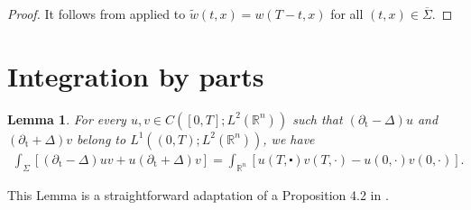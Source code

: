 \documentclass[10pt,a4paper]{amsart}
\newtheorem{lemma}[proposition]{Lemma}
\theoremstyle{remark}
\theoremstyle{definition}
\newcommand{\tm}{\mathrm{t}}
\begin{document}
\begin{proof}
It follows from  applied to $\tilde w (t, x) = w (T-t, x) $ for all
$(t, x) \in \overline{\Sigma}$.
\end{proof}






\appendix 

\section{Integration by parts}\label{app:integration-parts}
\begin{lemma}\label{L_A.1}\sl
For every $u, v \in C([0, T] ; L^2(\mathbb{R}^n))$ such that $( \partial_\tm-\Delta) u$ and $(\partial_\tm+\Delta) v$ belong to $L^1((0, T) ; L^2(\mathbb{R}^n))$, we have
\begin{align*}
  \int_{\Sigma}\left[( \partial_{\mathrm{t}}-\Delta) u v + u (\partial_{\mathrm{t}}+\Delta) v \right]= \int_{\mathbb{R}^n}\left[u(T, \centerdot) v(T, \cdot)-u(0, \cdot) v(0, \cdot)\right] .  
\end{align*}
\end{lemma}

This Lemma is a straightforward adaptation of a Proposition 4.2 in \cite{zbMATH07801151}.
\end{document}

